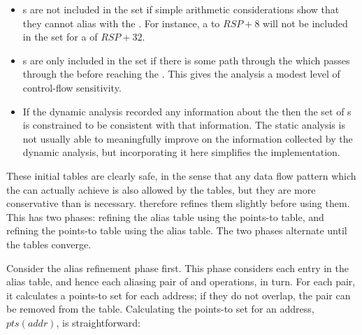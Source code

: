 \begin{itemize}
\item {}s are not included in the set if simple arithmetic
  considerations show that they cannot alias with the .
  For instance, a  to $RSP+8$ will not be included in the
  set for a  of $RSP+32$.  
\item {}s are only included in the set if there is some
  path through the {\StateMachine} which passes through the
   before reaching the .  This gives the
  analysis a modest level of control-flow sensitivity.
\item If the dynamic analysis recorded any information about the
   then the set of s is constrained to be
  consistent with that information.  The static analysis is not
  usually able to meaningfully improve on the information collected by
  the dynamic analysis, but incorporating it here simplifies the
  implementation.
\end{itemize}

These initial tables are clearly safe, in the sense that any data flow
pattern which the {\StateMachine} can actually achieve is also allowed
by the tables, but they are more conservative than is necessary.
{\Technique} therefore refines them slightly before using them.  This
has two phases: refining the alias table using the points-to table,
and refining the points-to table using the alias table.  The two
phases alternate until the tables converge.

Consider the alias refinement phase first.  This phase considers each
entry in the alias table, and hence each aliasing pair of 
and  operations, in turn.  For each pair, it calculates a
points-to set for each address; if they do not overlap, the pair can
be removed from the table.  Calculating the points-to set for an
address, $\mathit{pts}(\mathit{addr})$, is straightforward:

